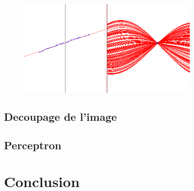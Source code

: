 \documentclass{article}
\begin{document}
\begin{figure}[hp]
\centering
\includegraphics[width=0.80\textwidth]{img/hough.png}
\end{figure}
\subsection{Decoupage de l'image}
\subsection{Perceptron}
\section{Conclusion}
\end{document}
